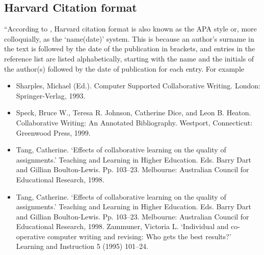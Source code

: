 
\subsection{Harvard Citation format}

“According to \cite{James2008}, Harvard citation format is also known as the APA style or, more colloquially, as the ‘name(date)’ system. This is because an author’s surname in the text is followed by the date of the publication in brackets, and entries in the reference list are listed alphabetically, starting with the name and the initials of the author(s) followed by the date of publication for each entry. For example


\begin{itemize}
	\item Sharples, Michael (Ed.). Computer Supported Collaborative Writing. London:
Springer-Verlag, 1993.
	\item Speck, Bruce W., Teresa R. Johnson, Catherine Dice, and Leon B. Heaton.
Collaborative Writing: An Annotated Bibliography. Westport, Connecticut: Greenwood Press, 1999.
	\item Tang, Catherine. ‘Effects of collaborative learning on the quality of
assignments.’ Teaching and Learning in Higher Education. Eds. Barry
Dart and Gillian Boulton-Lewis. Pp. 103–23. Melbourne: Australian
Council for Educational Research, 1998.
	\item Tang, Catherine. ‘Effects of collaborative learning on the quality of
assignments.’ Teaching and Learning in Higher Education. Eds. Barry
Dart and Gillian Boulton-Lewis. Pp. 103–23. Melbourne: Australian
Council for Educational Research, 1998.
Zammuner, Victoria L. ‘Individual and co-operative computer writing
and revising: Who gets the best results?’ Learning and Instruction 5
(1995) 101–24.
\end{itemize}